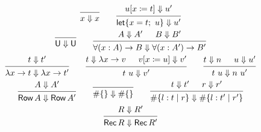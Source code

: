 \begin{figure}
  \begin{gather*}
    \begin{prooftree}
      \infer0{x \Downarrow x}
    \end{prooftree}
    \qquad
    \begin{prooftree}
      \hypo{u[x \coleqq t] \Downarrow u'}
      \infer1{\Let \{ x = t;\ u \} \Downarrow u'}
    \end{prooftree}
    \\
    \begin{prooftree}
      \infer0{\Univ \Downarrow \Univ}
    \end{prooftree}
    \qquad
    \begin{prooftree}
      \hypo{A \Downarrow A'}
      \hypo{B \Downarrow B'}
      \infer2{\forall (x : A) \to B \Downarrow \forall (x : A') \to B'}
    \end{prooftree}
    \\
    \begin{prooftree}
      \hypo{t \Downarrow t'}
      \infer1{\lambda x \to t \Downarrow \lambda x \to t'}
    \end{prooftree}
    \qquad
    \begin{prooftree}
      \hypo{t \Downarrow \lambda x \to v}
      \hypo{v[x \coleqq u] \Downarrow v'}
      \infer2{t\ u \Downarrow v'}
    \end{prooftree}
    \qquad
    \begin{prooftree}
      \hypo{t \Downarrow n}
      \hypo{u \Downarrow u'}
      \infer2{t\ u \Downarrow n\ u'}
    \end{prooftree}
    \\
    \begin{prooftree}
      \hypo{A \Downarrow A'}
      \infer1{\RowType A \Downarrow \RowType A'}
    \end{prooftree}
    \qquad
    \begin{prooftree}
      \infer0{\# \{ \} \Downarrow \# \{ \}}
    \end{prooftree}
    \qquad
    \begin{prooftree}
      \hypo{t \Downarrow t'}
      \hypo{r \Downarrow r'}
      \infer2{\# \{ l : t \mid r \} \Downarrow \# \{ l : t' \mid r' \}}
    \end{prooftree}
    \\
    \begin{prooftree}
      \hypo{R \Downarrow R'}
      \infer1{\RecordType R \Downarrow \RecordType R'}
    \end{prooftree}

\end{gather*}
\end{figure}

